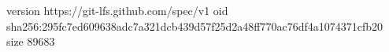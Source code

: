 version https://git-lfs.github.com/spec/v1
oid sha256:295fc7ed609638adc7a321dcb439d57f25d2a48ff770ac76df4a1074371cfb20
size 89683
